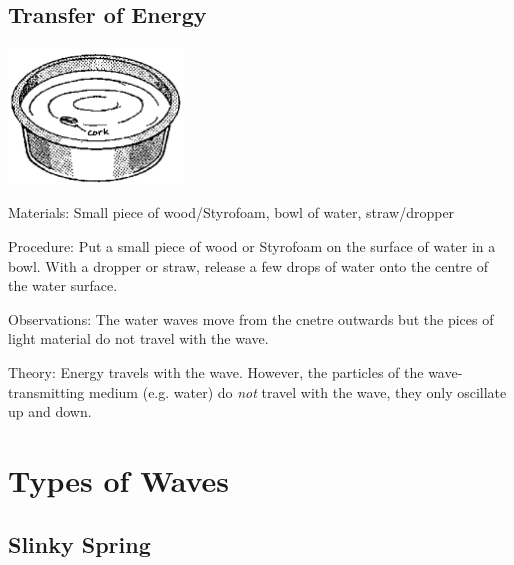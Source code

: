 \begin{multicols}{2}
\subsection{Transfer of Energy}

\begin{center}
\includegraphics[width=0.35\textwidth]{./img/source/trans-energy.png}
\end{center}

\begin{description*}
\item[Materials:]{Small piece of wood/Styrofoam, bowl of water, straw/dropper}
\item[Procedure:]{Put a small piece of wood or Styrofoam on the surface of water in a bowl. With a dropper or straw, release a few drops of water onto the centre of the water surface.}
\item[Observations:]{The water waves move from the cnetre outwards but the pices of light material do not travel with the wave.}
\item[Theory:]{Energy travels with the wave. However, the particles of the wave-transmitting medium (e.g. water) do \emph{not} travel with the wave, they only oscillate up and down.}
\end{description*}


\section*{Types of Waves}


\subsection{Slinky Spring}


\end{multicols}
